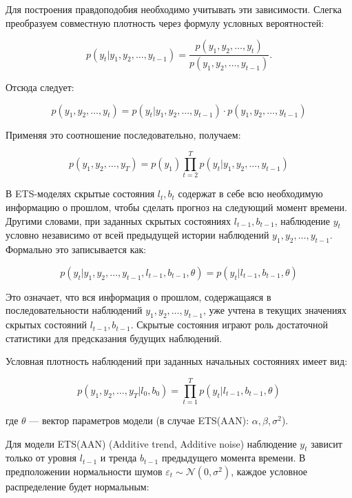 \documentclass[12pt,fleqn]{article}
\begin{document}
Для построения правдоподобия необходимо учитывать эти зависимости.
Слегка преобразуем совместную плотность через формулу условных вероятностей:

\begin{equation}
  p(y_t | y_1, y_2, \ldots, y_{t-1}) = \frac{p(y_1, y_2, \ldots, y_t)}{p(y_1, y_2, \ldots, y_{t-1})}.
\end{equation}

Отсюда следует:

\begin{equation}
  p(y_1, y_2, \ldots, y_t) = p(y_t | y_1, y_2, \ldots, y_{t-1}) \cdot p(y_1, y_2, \ldots, y_{t-1})
\end{equation}

Применяя это соотношение последовательно, получаем:

\begin{equation}
  p(y_1, y_2, \ldots, y_T) = p(y_1) \prod_{t=2}^{T} p(y_t | y_1, y_2, \ldots, y_{t-1})
\end{equation}

В ETS-моделях скрытые состояния $l_t, b_t$ содержат в себе всю необходимую информацию о прошлом, чтобы сделать прогноз на следующий момент времени.
Другими словами, при заданных скрытых состояниях $l_{t-1}, b_{t-1}$, наблюдение $y_t$ условно независимо от всей предыдущей истории наблюдений $y_1, y_2, \ldots, y_{t-1}$.
Формально это записывается как:

\begin{equation}
  p(y_t | y_1, y_2, \ldots, y_{t-1}, l_{t-1}, b_{t-1}, \theta) = p(y_t | l_{t-1}, b_{t-1}, \theta)
\end{equation}

Это означает, что вся информация о прошлом, содержащаяся в последовательности наблюдений $y_1, y_2, \ldots, y_{t-1}$, уже учтена в текущих значениях скрытых состояний $l_{t-1}, b_{t-1}$.
Скрытые состояния играют роль достаточной статистики для предсказания будущих наблюдений.

Условная плотность наблюдений при заданных начальных состояниях имеет вид:

\begin{equation}
  p(y_1, y_2, \ldots, y_T | l_0, b_0) = \prod_{t=1}^{T} p(y_t | l_{t-1}, b_{t-1}, \theta)
\end{equation}

где $\theta$ — вектор параметров модели (в случае ETS(AAN): $\alpha, \beta, \sigma^2$).

Для модели ETS(AAN) (Additive trend, Additive noise) наблюдение $y_t$ зависит только от уровня $l_{t-1}$ и тренда $b_{t-1}$ предыдущего момента времени.
В предположении нормальности шумов $\varepsilon_t \sim \mathcal{N}(0, \sigma^2)$, каждое условное распределение будет нормальным:
\end{document}
